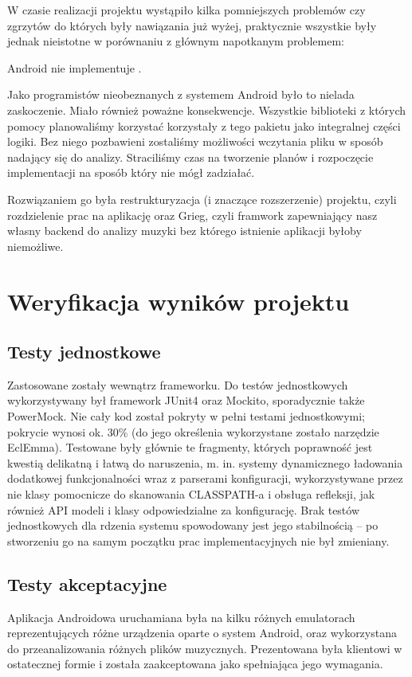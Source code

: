 W czasie realizacji projektu wystąpiło kilka pomniejszych problemów czy zgrzytów do których były nawiązania już wyżej, praktycznie wszystkie były jednak nieistotne w porównaniu z głównym napotkanym problemem:

Android nie implementuje .

Jako programistów nieobeznanych z systemem Android było to nielada zaskoczenie. Miało również poważne konsekwencje. Wszystkie biblioteki z których pomocy planowaliśmy korzystać korzystały z tego pakietu jako integralnej części logiki. Bez niego pozbawieni zostaliśmy możliwości wczytania pliku w sposób nadający się do analizy. Straciliśmy czas na tworzenie planów i rozpoczęcie implementacji na sposób który nie mógł zadziałać.

Rozwiązaniem go była restrukturyzacja (i znaczące rozszerzenie) projektu, czyli rozdzielenie prac na aplikację oraz Grieg, czyli framwork zapewniający nasz własny backend do analizy muzyki bez którego istnienie aplikacji byłoby niemożliwe.

\chapter{Weryfikacja wyników projektu}

\section{Testy jednostkowe}
Zastosowane zostały wewnątrz frameworku. Do testów jednostkowych wykorzystywany był framework JUnit4 oraz Mockito, sporadycznie także
PowerMock. Nie cały kod został pokryty w pełni testami jednostkowymi; pokrycie wynosi ok. 30\% (do
jego określenia wykorzystane zostało narzędzie EclEmma). Testowane były głównie te fragmenty,
których poprawność jest kwestią delikatną i łatwą do naruszenia, m. in. systemy dynamicznego
ładowania dodatkowej funkcjonalności wraz z parserami konfiguracji, wykorzystywane przez nie klasy
pomocnicze do skanowania CLASSPATH-a i obsługa refleksji, jak również API modeli i klasy
odpowiedzialne za konfigurację. Brak testów jednostkowych dla rdzenia systemu spowodowany jest jego
stabilnością -- po stworzeniu go na samym początku prac implementacyjnych nie był zmieniany.

\section{Testy akceptacyjne}
Aplikacja Androidowa uruchamiana była na kilku różnych emulatorach reprezentujących różne urządzenia oparte o system Android, oraz wykorzystana do przeanalizowania różnych plików muzycznych. Prezentowana była klientowi w ostatecznej formie i została zaakceptowana jako spełniająca jego wymagania.


